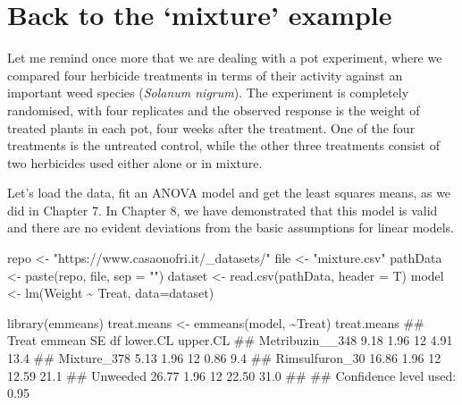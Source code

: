 \documentclass[a4paper,12pt,oneside]{book}
\newenvironment{Shaded}{\begin{snugshade}}{\end{snugshade}}
\newcommand{\SpecialCharTok}[1]{#1}
\newcommand{\StringTok}[1]{#1}
\newcommand{\DocumentationTok}[1]{#1}
\newcommand{\OtherTok}[1]{#1}
\newcommand{\FunctionTok}[1]{#1}
\newcommand{\AttributeTok}[1]{#1}
\newcommand{\NormalTok}[1]{#1}
\begin{document}
\hypertarget{back-to-the-mixture-example}{%
\section{Back to the `mixture' example}\label{back-to-the-mixture-example}}

Let me remind once more that we are dealing with a pot experiment, where we compared four herbicide treatments in terms of their activity against an important weed species (\emph{Solanum nigrum}). The experiment is completely randomised, with four replicates and the observed response is the weight of treated plants in each pot, four weeks after the treatment. One of the four treatments is the untreated control, while the other three treatments consist of two herbicides used either alone or in mixture.

Let's load the data, fit an ANOVA model and get the least squares means, as we did in Chapter 7. In Chapter 8, we have demonstrated that this model is valid and there are no evident deviations from the basic assumptions for linear models.

\vspace{12pt}

\begin{Shaded}
\begin{Highlighting}[]
\NormalTok{repo }\OtherTok{\textless{}{-}} \StringTok{"https://www.casaonofri.it/\_datasets/"}
\NormalTok{file }\OtherTok{\textless{}{-}} \StringTok{"mixture.csv"}
\NormalTok{pathData }\OtherTok{\textless{}{-}} \FunctionTok{paste}\NormalTok{(repo, file, }\AttributeTok{sep =} \StringTok{""}\NormalTok{)}
\NormalTok{dataset }\OtherTok{\textless{}{-}} \FunctionTok{read.csv}\NormalTok{(pathData, }\AttributeTok{header =}\NormalTok{ T)}
\NormalTok{model }\OtherTok{\textless{}{-}} \FunctionTok{lm}\NormalTok{(Weight }\SpecialCharTok{\textasciitilde{}}\NormalTok{ Treat, }\AttributeTok{data=}\NormalTok{dataset)}

\FunctionTok{library}\NormalTok{(emmeans)}
\NormalTok{treat.means }\OtherTok{\textless{}{-}} \FunctionTok{emmeans}\NormalTok{(model, }\SpecialCharTok{\textasciitilde{}}\NormalTok{Treat)}
\NormalTok{treat.means}
\DocumentationTok{\#\#  Treat           emmean   SE df lower.CL upper.CL}
\DocumentationTok{\#\#  Metribuzin\_\_348   9.18 1.96 12     4.91     13.4}
\DocumentationTok{\#\#  Mixture\_378       5.13 1.96 12     0.86      9.4}
\DocumentationTok{\#\#  Rimsulfuron\_30   16.86 1.96 12    12.59     21.1}
\DocumentationTok{\#\#  Unweeded         26.77 1.96 12    22.50     31.0}
\DocumentationTok{\#\# }
\DocumentationTok{\#\# Confidence level used: 0.95}
\end{Highlighting}
\end{Shaded}
\end{document}

